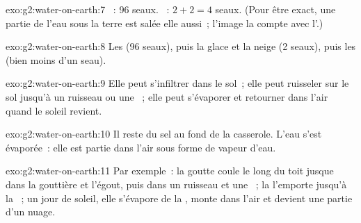 \begin{solution}{exo:g2:water-on-earth:7}
~: 96 seaux. ~: $2 + 2 = 4$ seaux.
(Pour être exact, une partie de l'eau sous la terre est salée elle aussi~;
l'image la compte avec l'.)
\end{solution}

\begin{solution}{exo:g2:water-on-earth:8}
Les  (96 seaux), puis la glace et la neige (2 seaux), puis les
 (bien moins d'un seau).
\end{solution}

\begin{solution}{exo:g2:water-on-earth:9}
Elle peut s'infiltrer dans le sol~; elle peut ruisseler sur le sol jusqu'à
un ruisseau ou une ~; elle peut s'évaporer et retourner dans l'air
quand le soleil revient.
\end{solution}

\begin{solution}{exo:g2:water-on-earth:10}
Il reste du sel au fond de la casserole. L'eau s'est évaporée~: elle est
partie dans l'air sous forme de vapeur d'eau.
\end{solution}

\begin{solution}{exo:g2:water-on-earth:11}
Par exemple~: la goutte coule le long du toit jusque dans la gouttière et
l'égout, puis dans un ruisseau et une ~; la  l'emporte jusqu'à
la ~; un jour de soleil, elle s'évapore de la , monte dans l'air et
devient une partie d'un nuage.
\end{solution}
